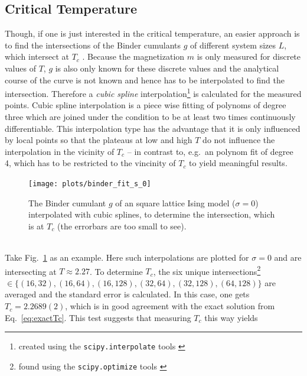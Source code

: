 \subsection{Critical Temperature}
\label{ssec:binderIntersections}
    Though, if one is just interested in the critical temperature, an
    easier approach is to find the intersections of the Binder cumulants
    \(g\) of different system sizes \(L\), which intersect at \(T_c\) \cite{Binder1981}.
    Because the magnetization \(m\) is only measured for discrete values
    of \(T\), \(g\) is also only known for these discrete values and the
    analytical course of the curve is not known and hence has
    to be interpolated to find the intersection. Therefore a \emph{cubic spline}
    interpolation\footnote{created using the \texttt{scipy.interpolate} tools \cite{scipy2001}}
    is calculated for the measured points.
    Cubic spline interpolation is a piece wise fitting of polynoms of
    degree three which are joined under the condition to be at least two
    times continuously differentiable. This interpolation type has the
    advantage that it is only influenced by local points so that the
    plateaus at low and high \(T\) do not influence the interpolation in
    the vicinity of \(T_c\) -- in contrast to, e.g.\ an polynom fit of
    degree 4, which has to be restricted to the vincinity of \(T_c\) to
    yield meaningful results.
    \begin{figure}[htbp]
        \centering
        \texttt{[image: plots/binder\_fit\_s\_0]}
        \caption[Example of a Binder Cumulant to Determine the Critical Temperature]
        {
            The Binder cumulant \(g\) of an square lattice Ising model
            (\(\sigma=0\)) interpolated with cubic splines, to determine
            the intersection, which is at \(T_c\)
            (the errorbars are too small to see).
        }
        \label{fig:gettingCrit:binder_fit_s_0}
    \end{figure}\\
    Take Fig.\ \ref{fig:gettingCrit:binder_fit_s_0} as an example.
    Here such interpolations are plotted for \(\sigma=0\) and are
    intersecting at \(T \approx 2.27\).
    To determine \(T_c\), the six unique intersections\footnote{found using the \texttt{scipy.optimize} tools \cite{scipy2001}} \(\in \{(16,32),(16,64),(16,128),(32,64),(32,128),(64,128)\}\)
    are averaged and the standard error is calculated. In this case, one
    gets \(T_c = 2.2689(2)\), which is in good agreement with the
    exact solution from Eq.\ \eqref{eq:exactTc}.
    This test suggests that measuring \(T_c\) this way yields
